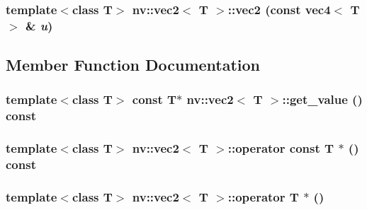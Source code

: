 \hypertarget{classnv_1_1vec2_ca83899c4d744af570583db60cc71ecc}{
\subsubsection[{vec2}]{\setlength{\rightskip}{0pt plus 5cm}template$<$class T$>$ {\bf nv::vec2}$<$ T $>$::{\bf vec2} (const {\bf vec4}$<$ T $>$ \& {\em u})}}
\label{classnv_1_1vec2_ca83899c4d744af570583db60cc71ecc}




\subsection{Member Function Documentation}
\hypertarget{classnv_1_1vec2_2addaebdbc4f636a77fcd481796ba6d0}{
\subsubsection[{get\_\-value}]{\setlength{\rightskip}{0pt plus 5cm}template$<$class T$>$ const T$\ast$ {\bf nv::vec2}$<$ T $>$::get\_\-value () const}}
\label{classnv_1_1vec2_2addaebdbc4f636a77fcd481796ba6d0}


\hypertarget{classnv_1_1vec2_20cc5f5e2fa68f38fd373e2cd1798be4}{
\subsubsection[{operator const T $\ast$}]{\setlength{\rightskip}{0pt plus 5cm}template$<$class T$>$ {\bf nv::vec2}$<$ T $>$::operator const T $\ast$ () const}}
\label{classnv_1_1vec2_20cc5f5e2fa68f38fd373e2cd1798be4}


\hypertarget{classnv_1_1vec2_e3d01a8be7d8b3e254e8796a552227f5}{
\subsubsection[{operator T $\ast$}]{\setlength{\rightskip}{0pt plus 5cm}template$<$class T$>$ {\bf nv::vec2}$<$ T $>$::operator T $\ast$ ()}}
\label{classnv_1_1vec2_e3d01a8be7d8b3e254e8796a552227f5}


